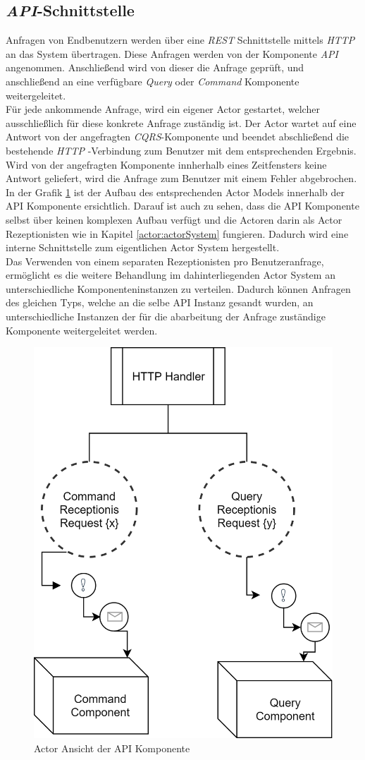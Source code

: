 \subsection{\textit{API}-Schnittstelle}
\label{subsec:implementation:apiComponente}
Anfragen von Endbenutzern werden über eine \textit{REST} Schnittstelle mittels \textit{HTTP} an das System übertragen. Diese Anfragen werden von der Komponente \textit{API} angenommen. Anschließend wird von dieser die Anfrage geprüft, und anschließend an eine verfügbare \textit{Query} oder \textit{Command} Komponente weitergeleitet. \\
Für jede ankommende Anfrage, wird ein eigener Actor gestartet, welcher ausschließlich für diese konkrete Anfrage zuständig ist. Der Actor wartet auf eine Antwort von der angefragten \textit{CQRS}-Komponente und beendet abschließend die bestehende \textit{HTTP}         -Verbindung zum Benutzer mit dem entsprechenden Ergebnis. Wird von der angefragten Komponente innherhalb eines Zeitfensters keine Antwort geliefert, wird die Anfrage zum Benutzer mit einem Fehler abgebrochen. \\
In der Grafik \ref{fig:implementation:apiActorModel} ist der Aufbau des entsprechenden Actor Models innerhalb der API Komponente ersichtlich. Darauf ist auch zu sehen, dass die API Komponente selbst über keinen komplexen Aufbau verfügt und die Actoren darin als Actor Rezeptionisten wie in Kapitel \ref{actor:actorSystem} fungieren. Dadurch wird eine interne Schnittstelle zum eigentlichen Actor System hergestellt. \\
Das Verwenden von einem separaten Rezeptionisten pro Benutzeranfrage, ermöglicht es die weitere Behandlung im dahinterliegenden Actor System an unterschiedliche Komponenteninstanzen zu verteilen. Dadurch können Anfragen des gleichen Typs, welche an die selbe API Instanz gesandt wurden,  an unterschiedliche Instanzen der für die abarbeitung der Anfrage zuständige Komponente weitergeleitet werden. 
\begin{figure}
    \centering
    \includegraphics[width=0.5\linewidth]{gfx/implementation/apiActorModel}
    \caption{Actor Ansicht der API Komponente}
    \label{fig:implementation:apiActorModel}
\end{figure} 

